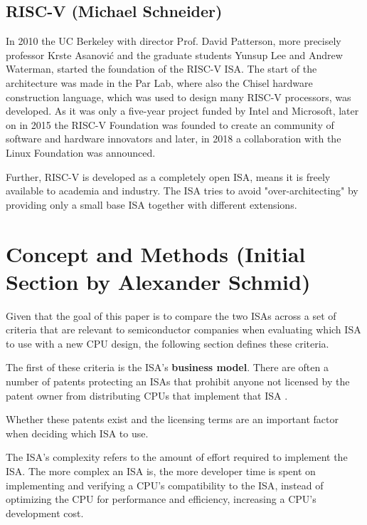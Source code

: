 \documentclass[conference]{IEEEtran}
\begin{document}
	\subsection{RISC-V (Michael Schneider)}
	In 2010 the UC Berkeley with director Prof. David Patterson, more precisely professor Krste Asanovi\'{c} and the graduate students Yunsup Lee and Andrew Waterman, started the foundation of the RISC-V \gls{ISA}. The start of the architecture was made in the \gls{Par Lab}, where also the Chisel hardware construction language, which was used to design many RISC-V processors, was developed. As it was only a five-year project funded by Intel and Microsoft, later on in 2015 the RISC-V Foundation was founded to create an community of software and hardware innovators and later, in 2018 a collaboration with the Linux Foundation was announced. \cite{International2020}

	Further, RISC-V is developed as a completely open ISA, means it is freely available to academia and industry. The \gls{ISA} tries to avoid "over-architecting" by providing only a small base \gls{ISA} together with different extensions. \cite[page 1]{Waterman2017}
	
\section{Concept and Methods (Initial Section by Alexander Schmid)}
	\label{ref:concept}

Given that the goal of this paper is to compare the two \glspl{ISA}
across a set of criteria that are relevant to semiconductor companies when evaluating which \gls{ISA} to use with a new CPU design,
the following section defines these criteria.

The first of these criteria is the \gls{ISA}'s \textbf{business model}. There are often a number of patents protecting an \glspl{ISA} that prohibit anyone not licensed
by the patent owner from distributing \glspl{CPU} that implement that \gls{ISA} \cite{Tang2011}.

Whether these patents exist and the licensing terms
are an important factor when deciding which \gls{ISA} to use.

The \gls{ISA}'s complexity refers to the amount of effort required to implement the \gls{ISA}. The more complex an \gls{ISA} is, the more developer
time is spent on implementing and verifying a \gls{CPU}'s compatibility to the \gls{ISA}, instead of optimizing the \gls{CPU} for performance and efficiency,
increasing a \gls{CPU}'s development cost. \cite{Patterson1980}
\end{document}

